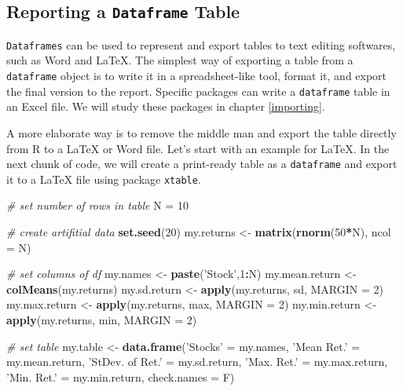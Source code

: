 \documentclass[11pt,]{book}
\newenvironment{Shaded}{\begin{snugshade}}{\end{snugshade}}
\newcommand{\KeywordTok}[1]{\textcolor[rgb]{0.27,0.27,0.27}{\textbf{#1}}}
\newcommand{\DataTypeTok}[1]{\textcolor[rgb]{0.27,0.27,0.27}{#1}}
\newcommand{\DecValTok}[1]{\textcolor[rgb]{0.06,0.06,0.06}{#1}}
\newcommand{\StringTok}[1]{\textcolor[rgb]{0.5,0.5,0.5}{#1}}
\newcommand{\CommentTok}[1]{\textcolor[rgb]{0.56,0.35,0.01}{\textit{#1}}}
\newcommand{\OperatorTok}[1]{\textcolor[rgb]{0.81,0.36,0.00}{\textbf{#1}}}
\newcommand{\NormalTok}[1]{#1}
\begin{document}
\subsection{\texorpdfstring{Reporting a \texttt{Dataframe}
Table}{Reporting a Dataframe Table}}\label{reporting-a-dataframe-table}

\texttt{Dataframes} can be used to represent and export tables to text
editing softwares, such as Word and LaTeX. The simplest way of exporting
a table from a \texttt{dataframe} object is to write it in a
spreadsheet-like tool, format it, and export the final version to the
report. Specific packages can write a \texttt{dataframe} table in an
Excel file. We will study these packages in chapter \ref{importing}.

A more elaborate way is to remove the middle man and export the table
directly from R to a LaTeX or Word file. Let's start with an example for
LaTeX. In the next chunk of code, we will create a print-ready table as
a \texttt{dataframe} and export it to a LaTeX file using package
\texttt{xtable}.  

\begin{Shaded}
\begin{Highlighting}[]
\CommentTok{# set number of rows in table}
\NormalTok{N =}\StringTok{ }\DecValTok{10}

\CommentTok{# create artifitial data}
\KeywordTok{set.seed}\NormalTok{(}\DecValTok{20}\NormalTok{)}
\NormalTok{my.returns <-}\StringTok{ }\KeywordTok{matrix}\NormalTok{(}\KeywordTok{rnorm}\NormalTok{(}\DecValTok{50}\OperatorTok{*}\NormalTok{N), }\DataTypeTok{ncol =}\NormalTok{ N)}

\CommentTok{# set columns of df}
\NormalTok{my.names <-}\StringTok{ }\KeywordTok{paste}\NormalTok{(}\StringTok{'Stock'}\NormalTok{,}\DecValTok{1}\OperatorTok{:}\NormalTok{N)}
\NormalTok{my.mean.return <-}\StringTok{ }\KeywordTok{colMeans}\NormalTok{(my.returns)}
\NormalTok{my.sd.return <-}\StringTok{ }\KeywordTok{apply}\NormalTok{(my.returns, sd, }\DataTypeTok{MARGIN =} \DecValTok{2}\NormalTok{)}
\NormalTok{my.max.return <-}\StringTok{ }\KeywordTok{apply}\NormalTok{(my.returns, max, }\DataTypeTok{MARGIN =} \DecValTok{2}\NormalTok{)}
\NormalTok{my.min.return <-}\StringTok{ }\KeywordTok{apply}\NormalTok{(my.returns, min, }\DataTypeTok{MARGIN =} \DecValTok{2}\NormalTok{)}

\CommentTok{# set table}
\NormalTok{my.table <-}\StringTok{ }\KeywordTok{data.frame}\NormalTok{(}\StringTok{'Stocks'}\NormalTok{ =}\StringTok{ }\NormalTok{my.names,}
                       \StringTok{'Mean Ret.'}\NormalTok{ =}\StringTok{ }\NormalTok{my.mean.return,}
                       \StringTok{'StDev. of Ret.'}\NormalTok{ =}\StringTok{ }\NormalTok{my.sd.return,}
                       \StringTok{'Max. Ret.'}\NormalTok{ =}\StringTok{ }\NormalTok{my.max.return,}
                       \StringTok{'Min. Ret.'}\NormalTok{ =}\StringTok{ }\NormalTok{my.min.return, }
                       \DataTypeTok{check.names =}\NormalTok{ F)}
\end{Highlighting}
\end{Shaded}
\end{document}
